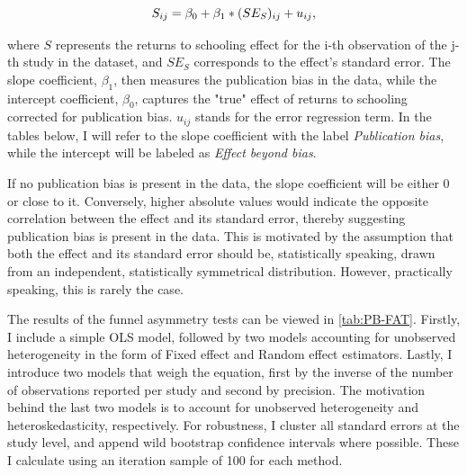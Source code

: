 \begin{equation}\label{eq:fat_reg}
  S_{ij} = \beta_0 + \beta_1 * (SE_{S})_{ij} + u_{ij},
  \vspace{0.3cm}
\end{equation}

where $S$ represents the returns to schooling effect for the i-th observation of the j-th study in the dataset, and $SE_{S}$ corresponds to the effect's standard error. The slope coefficient, $\beta_1$, then measures the publication bias in the data, while the intercept coefficient, $\beta_0$, captures the "true" effect of returns to schooling corrected for publication bias. $u_{ij}$ stands for the error regression term. In the tables below, I will refer to the slope coefficient with the label \textit{Publication bias}, while the intercept will be labeled as \textit{Effect beyond bias}.

If no publication bias is present in the data, the slope coefficient will be either 0 or close to it. Conversely, higher absolute values would indicate the opposite correlation between the effect and its standard error, thereby suggesting publication bias is present in the data. This is motivated by the assumption that both the effect and its standard error should be, statistically speaking, drawn from an independent, statistically symmetrical distribution. However, practically speaking, this is rarely the case.

The results of the funnel asymmetry tests can be viewed in \autoref{tab:PB-FAT}. Firstly, I include a simple \ac{OLS} model, followed by two models accounting for unobserved heterogeneity in the form of Fixed effect and Random effect estimators. Lastly, I introduce two models that weigh the equation, first by the inverse of the number of observations reported per study and second by precision. The motivation behind the last two models is to account for unobserved heterogeneity and heteroskedasticity, respectively. For robustness, I cluster all standard errors at the study level, and append wild bootstrap confidence intervals where possible. These I calculate using an iteration sample of 100 for each method.

